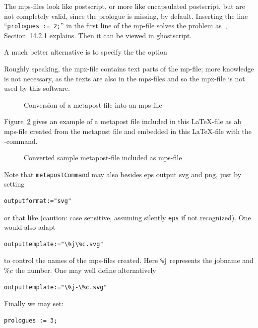 \documentclass[12pt]{book}
\newcommand{\gls}[1]{#1}
\begin{document}
The mps-files look like postscript, or more like encapsulated postscript, 
but are not completely valid, since the prologue is missing, by default. 
Inserting the line ``\texttt{prologues\ :=\ 2;}'' %
in the first line of the mp-file 
solves the problem as~\cite{MPost}, Section~14.2.1 explains. 
Then it can be viewed in ghostscript. 

A much better alternative is to specify the the option 


Roughly speaking, the mpx-file contains text parts of the mp-file; 
more knowledge is not necessary, as the texts are also in the mps-files 
and so the mpx-file is not used by this software. 

\begin{figure}[htb]
\centering
{}
\caption{\label{fig:mp2mps}Conversion of a metapost-file into an mps-file}
\end{figure}


Figure~\ref{fig:metapost} gives an example of a metapost file 
included in this \LaTeX-file as ab mps-file 
created from the metapost file 
and embedded in this \LaTeX-file 
with the -command. 

\begin{figure}[htb]
\centering
{}
\caption{\label{fig:metapost}
Converted sample metapost-file included as mps-file  }
\end{figure}

Note that \texttt{metapostCommand} may also besides \gls{eps} 
output \gls{svg} and \gls{png}, 
just by setting 
%
\begin{verbatim}
outputformat:="svg" 
\end{verbatim}
%
or that like 
(caution: case sensitive, assuming silently \texttt{eps} if not recognized). 
One would also adapt 
%
\begin{verbatim}
outputtemplate:="\%j\%c.svg"
\end{verbatim}
%
to control the names of the mps-files created. 
Here \texttt{\%j} represents the jobname and $\%c$ the number. 
One may well define alternatively 
%
\begin{verbatim}
outputtemplate:="\%j-\%c.svg"
\end{verbatim}

Finally we may set: 
%
\begin{verbatim}
prologues := 3;
\end{verbatim}
\end{document}

